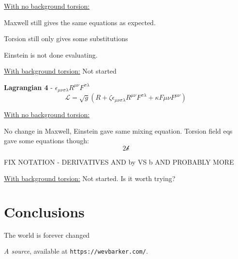 \documentclass[letterpaper,12pt]{article}
\begin{document}
\underline{With no background torsion:}

Maxwell still gives the same equations as expected.

Torsion still only gives some substitutions

Einstein is not done evaluating.



\underline{With background torsion:}
Not started


\textbf{Lagrangian 4} - $\epsilon_{\mu \nu \sigma \lambda} R^{\mu \nu} F^{\sigma \lambda}$
\begin{equation}
\mathcal{L}=\sqrt{g}(R+\zeta \epsilon_{\mu \nu \sigma \lambda} R^{\mu \nu} F^{\sigma \lambda}+\kappa F{\mu \nu}F^{\mu \nu})
\end{equation}

\underline{With no background torsion:}

No change in Maxwell, Einstein gave same mixing equation. Torsion field eqs gave some equations though:
\begin{equation}
2 \mathcal{b}
\end{equation}

FIX NOTATION - DERIVATIVES AND by VS b AND PROBABLY MORE

\underline{With background torsion:}
Not started. Is it worth trying?


\section{Conclusions}
The world is forever changed


\begin{thebibliography}{99}

 \emph{A source},  available at
\texttt{https://wevbarker.com/}.

\end{thebibliography}
\end{document}
